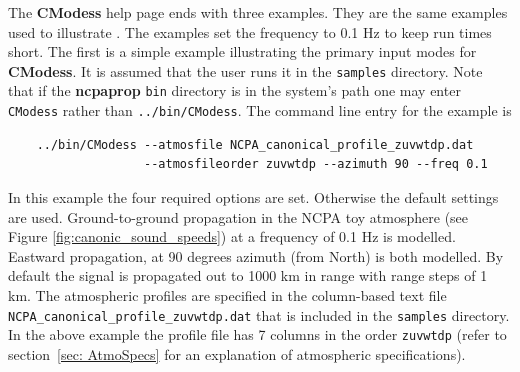 The \textbf{CModess} help page ends with three examples. They are the same examples used to illustrate . The examples set the frequency to 0.1 Hz to keep run times short. The first is a simple example illustrating the primary input modes for \textbf{CModess}. It is assumed that the user runs it in the \verb+samples+ directory. Note that if the \textbf{ncpaprop} \verb+bin+ directory is in the system's path one may enter \verb+CModess+ rather than \verb+../bin/CModess+. The command line entry for the example is 
\begin{verbatim} 
    ../bin/CModess --atmosfile NCPA_canonical_profile_zuvwtdp.dat 
                   --atmosfileorder zuvwtdp --azimuth 90 --freq 0.1
\end{verbatim}
In this example the four required options are set. Otherwise the default settings are used. Ground-to-ground propagation in the NCPA toy atmosphere (see Figure \ref{fig:canonic_sound_speeds}) at a frequency of 0.1 Hz is modelled. Eastward propagation, at 90 degrees azimuth (from North) is both modelled. By default the signal is propagated out to 1000 km in range with range steps of 1 km. The atmospheric profiles are specified in the column-based text file \verb+NCPA_canonical_profile_zuvwtdp.dat+ that is included in the \verb+samples+ directory. In the above example the profile file has 7 columns in the order \verb+zuvwtdp+ (refer to section~\ref{sec: AtmoSpecs}  for an explanation of atmospheric specifications). 


